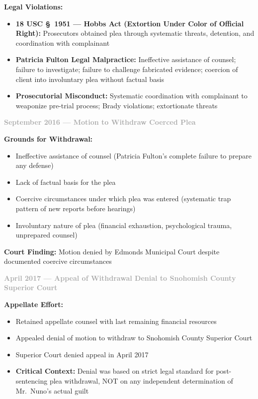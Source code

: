 \documentclass[11pt, letterpaper]{article}
\newcommand{\subsubsectiontitle}[1]{\vspace{0.1in}\noindent\textcolor{DarkGray}{\textbf{#1}}\vspace{0.05in}}
\begin{document}
\textbf{Legal Violations:}
\begin{itemize}[leftmargin=*,itemsep=2pt]
    \item \textbf{18 USC \S\ 1951 --- Hobbs Act (Extortion Under Color of Official Right):} Prosecutors obtained plea through systematic threats, detention, and coordination with complainant
    \item \textbf{Patricia Fulton Legal Malpractice:} Ineffective assistance of counsel; failure to investigate; failure to challenge fabricated evidence; coercion of client into involuntary plea without factual basis
    \item \textbf{Prosecutorial Misconduct:} Systematic coordination with complainant to weaponize pre-trial process; Brady violations; extortionate threats
\end{itemize}

\subsubsectiontitle{September 2016 --- Motion to Withdraw Coerced Plea}

\textbf{Grounds for Withdrawal:}
\begin{itemize}[leftmargin=*,itemsep=2pt]
    \item Ineffective assistance of counsel (Patricia Fulton's complete failure to prepare any defense)
    \item Lack of factual basis for the plea
    \item Coercive circumstances under which plea was entered (systematic trap pattern of new reports before hearings)
    \item Involuntary nature of plea (financial exhaustion, psychological trauma, unprepared counsel)
\end{itemize}

\textbf{Court Finding:} Motion denied by Edmonds Municipal Court despite documented coercive circumstances

\subsubsectiontitle{April 2017 --- Appeal of Withdrawal Denial to Snohomish County Superior Court}

\textbf{Appellate Effort:}
\begin{itemize}[leftmargin=*,itemsep=2pt]
    \item Retained appellate counsel with last remaining financial resources
    \item Appealed denial of motion to withdraw to Snohomish County Superior Court
    \item Superior Court denied appeal in April 2017
    \item \textbf{Critical Context:} Denial was based on strict legal standard for post-sentencing plea withdrawal, NOT on any independent determination of Mr.\ Nuno's actual guilt
\end{itemize}
\end{document}
